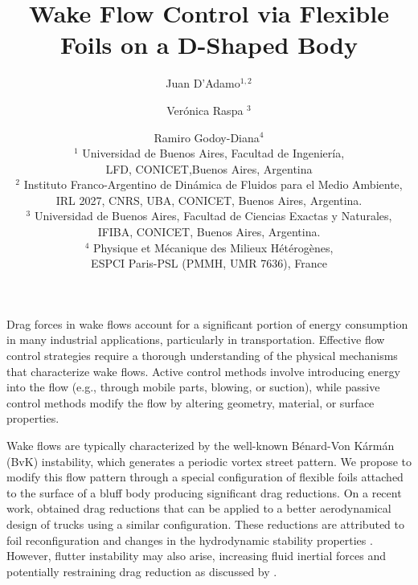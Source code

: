 \documentclass[a4paper,11pt]{article}
\begin{document}
\vspace{-1.0cm}

\title{Wake Flow Control via Flexible Foils on a D-Shaped Body}

\author{Juan D'Adamo$^{1,2}$ \and Verónica Raspa $^3$ \and Ramiro Godoy-Diana$^{4}$\\
  $^1$  Universidad de Buenos Aires, Facultad de Ingenier\'ia, \\LFD, CONICET,Buenos Aires, Argentina\\
$^2$ Instituto Franco-Argentino de Dinámica de Fluidos para el Medio Ambiente,\\ IRL 2027, CNRS, UBA, CONICET, Buenos Aires, Argentina.\\
  $^3$ Universidad de Buenos Aires, Facultad de Ciencias Exactas y Naturales,\\  IFIBA, CONICET,   Buenos Aires,  Argentina.\\
  $^4$ Physique et Mécanique des Milieux Hétérogènes, \\ESPCI Paris-PSL (PMMH, UMR 7636), France  
}
\date{}
\maketitle

Drag forces in wake flows account for a significant portion of energy consumption in many industrial applications, particularly in transportation. Effective flow control strategies require a thorough understanding of the physical mechanisms that characterize wake flows. Active control methods involve introducing energy into the flow (e.g., through mobile parts, blowing, or suction), while passive control methods modify the flow by altering geometry, material, or surface properties.


Wake flows are typically characterized by the well-known Bénard-Von Kármán (BvK) instability, which generates a periodic vortex street pattern. We propose to modify this flow pattern through a special configuration of flexible foils attached to the surface of a bluff body producing significant drag reductions. 	On a recent work, \cite{garcia2021drag} obtained drag reductions that can be applied to a better aerodynamical design of trucks using a similar configuration. 	
 These reductions are attributed to foil reconfiguration \cite{gosselin2010drag} and changes in the hydrodynamic stability properties \citep{strykowski1990formation,Giannetti:2007p127,thiria2009passive}. However, flutter instability may also arise, increasing fluid inertial forces and potentially restraining drag reduction as discussed by \cite{leclercq2018does}.
		 
\end{document}
